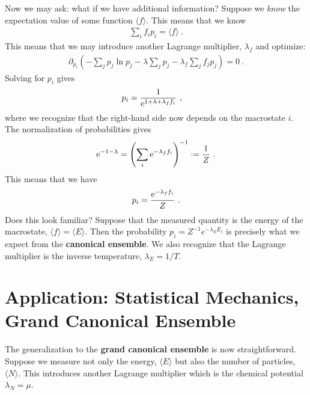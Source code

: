 Now we may ask: what if we have additional information? Suppose we \emph{know} the expectation value of some function $\langle f \rangle$. This means that we know
\begin{align}
    \sum_i f_i p_i = \langle f \rangle \ .
\end{align}
This means that we may introduce another Lagrange multiplier, $\lambda_f$ and optimize:
\begin{align}
    \partial_{p_i}
    \left(
        -\sum_j p_j \ln p_j
        - \lambda \sum_j p_j
        - \lambda_f \sum_j f_j p_j
    \right)
    = 0 \ .
\end{align}
Solving for $p_i$ gives
\begin{align}
    p_i &= \frac{1}{\operatorname{e}^{1+\lambda + \lambda_f f_i}} \ ,
\end{align}
where we recognize that the right-hand side now depends on the macrostate $i$. The normalization of probabilities gives
\begin{align}
    \e^{-1-\lambda}
    = 
    \left(
        \sum_i \e^{-\lambda_f f_i}
    \right)^{-1}
    \defeq
    \frac{1}{Z} \ .
\end{align}
This means that we have
\begin{align}
    p_i = \frac{\operatorname{e}^{-\lambda_f f_i}}{Z} \ .
\end{align}
Does this look familiar? Suppose that the measured quantity is the energy of the macrostate, $\langle f \rangle = \langle E \rangle$. Then the probability $p_i = Z^{-1}e^{-\lambda_E E_i}$ is precisely what we expect from the \textbf{canonical ensemble}. We also recognize that the Lagrange multiplier is the inverse temperature, $\lambda_E = 1/T$.




\section{Application: Statistical Mechanics, Grand Canonical Ensemble}

The generalization to the \textbf{grand canonical ensemble} is now straightforward. Suppose we measure not only the energy, $\langle E \rangle$ but also the number of particles, $\langle N \rangle$. This introduces another Lagrange multiplier which is the chemical potential $\lambda_N = \mu$. 













